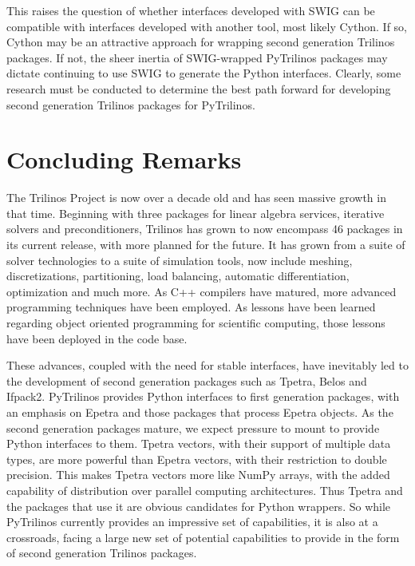 \documentclass[11pt]{article}
\begin{document}
This raises the question of whether interfaces developed with SWIG can be compatible with interfaces developed with another tool, most likely Cython.  If so, Cython may be an attractive approach for wrapping second generation Trilinos packages.  If not, the sheer inertia of SWIG-wrapped PyTrilinos packages may dictate continuing to use SWIG to generate the Python interfaces.  Clearly, some research must be conducted to determine the best path forward for developing second generation Trilinos packages for PyTrilinos.

\section{Concluding Remarks}
\label{sec:concluding remarks}

The Trilinos Project is now over a decade old and has seen massive growth in that time.  Beginning with three packages for linear algebra services, iterative solvers and preconditioners, Trilinos has grown to now encompass 46 packages in its current release, with more planned for the future.  It has grown from a suite of solver technologies to a suite of simulation tools, now include meshing, discretizations, partitioning, load balancing, automatic differentiation, optimization and much more.  As C++ compilers have matured, more advanced programming techniques have been employed.  As lessons have been learned regarding object oriented programming for scientific computing, those lessons have been deployed in the code base.

These advances, coupled with the need for stable interfaces, have inevitably led to the development of second generation packages such as Tpetra, Belos and Ifpack2.  PyTrilinos provides Python interfaces to first generation packages, with an emphasis on Epetra and those packages that process Epetra objects.  As the second generation packages mature, we expect pressure to mount to provide Python interfaces to them.  Tpetra vectors, with their support of multiple data types, are more powerful than Epetra vectors, with their restriction to double precision.  This makes Tpetra vectors more like NumPy arrays, with the added capability of distribution over parallel computing architectures.  Thus Tpetra and the packages that use it are obvious candidates for Python wrappers.  So while PyTrilinos currently provides an impressive set of capabilities, it is also at a crossroads, facing a large new set of potential capabilities to provide in the form of second generation Trilinos packages.



\end{document}
